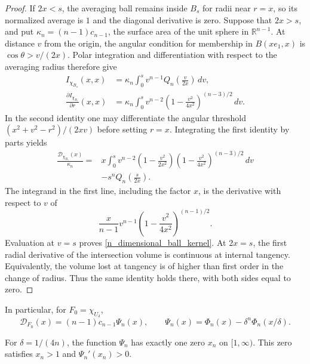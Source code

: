 \documentclass[12pt]{amsart}
\numberwithin{equation}{section}
\begin{document}
\begin{proof}
If $2x<s$, the averaging ball remains inside $B_s$ for radii near
$r=x$, so its normalized average is $1$ and the diagonal derivative
is zero. Suppose that $2x>s$, and put $\kappa_n=(n-1)c_{n-1}$,
the surface area of the unit sphere in $\mathbb{R}^{n-1}$.
At distance $v$ from the origin, the angular condition for membership
in $B(xe_1,x)$ is $\cos\theta>v/(2x)$. Polar integration and
differentiation with respect to the averaging radius therefore give
\begin{align*}
I_{\chi_{B_s}}(x,x)
 &=\kappa_n\int_0^s v^{n-1}Q_n\!\left(\frac{v}{2x}\right)\,dv,\\
\frac{\partial I_{\chi_{B_s}}}{\partial r}(x,x)
 &=\kappa_n\int_0^s v^{n-2}
          \left(1-\frac{v^2}{4x^2}\right)^{(n-3)/2}\,dv.
\end{align*}
In the second identity one may differentiate the angular threshold
$(x^2+v^2-r^2)/(2xv)$ before setting $r=x$.
Integrating the first identity by parts yields
\begin{align*}
\frac{\mathcal D_{\chi_{B_s}}(x)}{\kappa_n}
={}&x\int_0^s v^{n-2}
 \left(1-\frac{v^2}{2x^2}\right)
 \left(1-\frac{v^2}{4x^2}\right)^{(n-3)/2}\,dv\\
&-s^nQ_n\!\left(\frac{s}{2x}\right).
\end{align*}
The integrand in the first line, including the factor $x$, is the
derivative with respect to $v$ of
\[
\frac{x}{n-1}v^{n-1}
       \left(1-\frac{v^2}{4x^2}\right)^{(n-1)/2}.
\]
Evaluation at $v=s$ proves \eqref{n_dimensional_ball_kernel}.
At $2x=s$, the first radial derivative of the intersection volume
is continuous at internal tangency. Equivalently, the volume lost
at tangency is of higher than first order in the change of radius.
Thus the same identity holds there, with both sides equal to zero.
\end{proof}

In particular, for $F_0=\chi_{U_\delta}$,
\begin{equation}
\label{n_dimensional_psi}
\mathcal D_{F_0}(x)=(n-1)c_{n-1}\Psi_n(x),
\qquad
\Psi_n(x)=\Phi_n(x)-\delta^n\Phi_n(x/\delta).
\end{equation}

\begin{lemma}
\label{n_dimensional_unique_root}
For $\delta=1/(4n)$, the function $\Psi_n$ has exactly one zero
$x_n$ on $[1,\infty)$. This zero satisfies $x_n>1$ and
$\Psi_n'(x_n)>0$.
\end{lemma}
\end{document}
